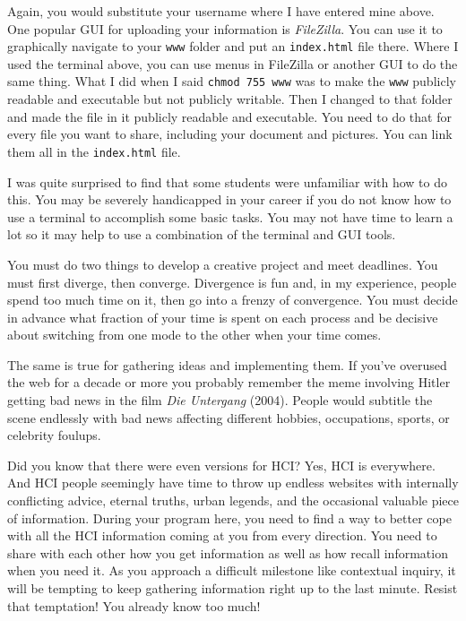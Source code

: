 Again, you would substitute your username where I have entered mine
above. One popular GUI for uploading your information is
\emph{FileZilla}. You can use it to graphically navigate to your
\texttt{www} folder and put an \verb|index.html| file there. Where I
used the terminal above, you can use menus in FileZilla or another GUI
to do the same thing. What I did when I said \texttt{chmod\ 755\ www}
was to make the \texttt{www} publicly readable and executable but not
publicly writable. Then I changed to that folder and made the file in it
publicly readable and executable. You need to do that for every file you
want to share, including your document and pictures. You can link them
all in the \verb|index.html| file.

I was quite surprised to find that some students were unfamiliar with
how to do this. You may be severely handicapped in your career if you do
not know how to use a terminal to accomplish some basic tasks. You may
not have time to learn a lot so it may help to use a combination of the
terminal and GUI tools.

\hypertarget{diverge-then-converge}{%
\label{diverge-then-converge}}

You must do two things to develop a creative project and meet deadlines.
You must first diverge, then converge. Divergence is fun and, in my
experience, people spend too much time on it, then go into a frenzy of
convergence. You must decide in advance what fraction of your time is
spent on each process and be decisive about switching from one mode to
the other when your time comes.

The same is true for gathering ideas and implementing them. If you've
overused the web for a decade or more you probably remember the meme
involving Hitler getting bad news in the film \emph{Die Untergang}
(2004). People would subtitle the scene endlessly with bad news
affecting different hobbies, occupations, sports, or celebrity foulups.

Did you know that there were even versions for HCI? Yes, HCI is
everywhere. And HCI people seemingly have time to throw up endless
websites with internally conflicting advice, eternal truths, urban
legends, and the occasional valuable piece of information. During your
program here, you need to find a way to better cope with all the HCI
information coming at you from every direction. You need to share with
each other how you get information as well as how recall information
when you need it. As you approach a difficult milestone like contextual
inquiry, it will be tempting to keep gathering information right up to
the last minute. Resist that temptation! You already know too much!

